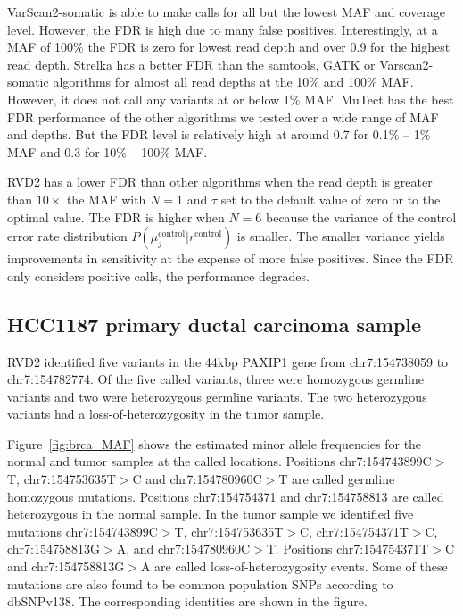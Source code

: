 \documentclass[11pt,reqno]{amsart}
\begin{document}
VarScan2-somatic is able to make calls for all but the lowest MAF and coverage level. However, the FDR is high due to many false positives. Interestingly, at a MAF of 100\% the FDR is zero for lowest read depth and over 0.9 for the highest read depth. Strelka has a better FDR than the samtools, GATK or Varscan2-somatic algorithms for almost all read depths at the 10\% and 100\% MAF. However, it does not call any variants at or below 1\% MAF.  MuTect has the best FDR performance of the other algorithms we tested over a wide range of MAF and depths. But the FDR level is relatively high at around 0.7 for 0.1\% -- 1\% MAF and 0.3 for 10\% -- 100\% MAF.
 
RVD2 has a lower FDR than other algorithms when the read depth is greater than $10\times$ the MAF with $N=1$ and $\tau$ set to the default value of zero or to the optimal value. The FDR is higher when $N=6$ because the variance of the control error rate distribution $P(\mu_j^{\text{control}} | r^{\text{control}})$ is smaller. The smaller variance yields improvements in sensitivity at the expense of more false positives. Since the FDR only considers positive calls, the performance degrades.


\subsection{HCC1187 primary ductal carcinoma sample}\label{sec:brca}

RVD2 identified five variants in the 44kbp PAXIP1 gene from chr7:154738059 to chr7:154782774. Of the five called variants, three were homozygous germline variants and two were heterozygous germline variants. The two heterozygous variants had a loss-of-heterozygosity in the tumor sample. 

Figure~\ref{fig:brca_MAF} shows the estimated minor allele frequencies for the normal and tumor samples at the called locations. Positions chr7:154743899C$>$T, chr7:154753635T$>$C and chr7:154780960C$>$T are called germline homozygous mutations. Positions chr7:154754371 and chr7:154758813 are called heterozygous in the normal sample. In the tumor sample we identified five mutations chr7:154743899C$>$T, chr7:154753635T$>$C, chr7:154754371T$>$C, chr7:154758813G$>$A, and chr7:154780960C$>$T. Positions chr7:154754371T$>$C and chr7:154758813G$>$A are called loss-of-heterozygosity events. Some of these mutations are also found to be common population SNPs according to dbSNPv138. The corresponding identities are shown in the figure.
\end{document}
